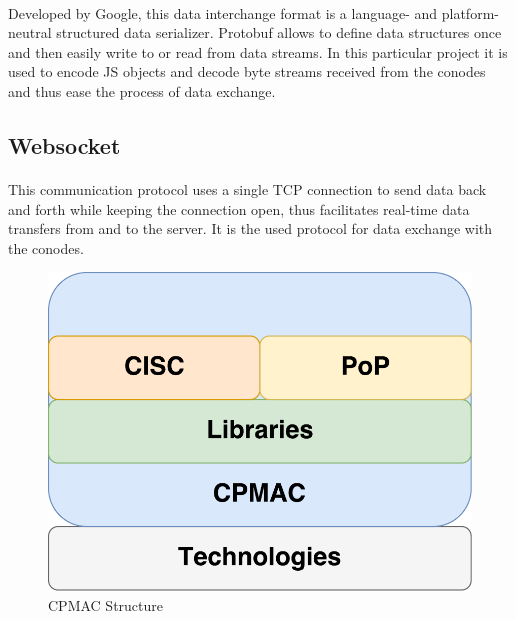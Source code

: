 \paragraph{}
Developed by Google, this data interchange format is a language- and platform-neutral structured data serializer. Protobuf allows to define data structures once and then easily write to or read from data streams. In this particular project it is used to encode JS objects and decode byte streams received from the conodes and thus ease the process of data exchange.

\subsection[Websocket]{Websocket\raisebox{.3\baselineskip}{\normalsize\footnotemark}}

\paragraph{}
This communication protocol uses a single TCP connection to send data back and forth while keeping the connection open, thus facilitates real-time data transfers from and to the server. It is the used protocol for data exchange with the conodes.

\begin{figure}[h]
\includegraphics[scale=.5]{graphic/cpmac.pdf}
\centering
\caption{CPMAC Structure}
\end{figure}
